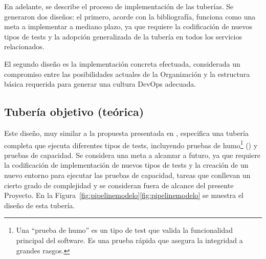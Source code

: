 En adelante, se describe el proceso de implementación de las
tuberías. Se generaron dos diseños: el primero, acorde con la
bibliografía, funciona como una meta a implementar a mediano plazo, ya
que requiere la codificación de nuevos tipos de tests y la adopción
generalizada de la tubería en todos los servicios relacionados.

El segundo diseño es la implementación concreta efectuada, considerada
un compromiso entre las posibilidades actuales de la Organización y la
estructura básica requerida para generar una cultura DevOps adecuada.

\subsection{Tubería objetivo (teórica)}
%
Este diseño, muy similar a la propuesta presentada en
\cite{humblefarley}, especifica una tubería completa que ejecuta
diferentes tipos de tests, incluyendo pruebas de humo\footnote{ Una
  ``prueba de humo'' es un tipo de test que valida la funcionalidad
  principal del software. Es una prueba rápida que asegura la
  integridad a grandes rasgos.} () y pruebas de
capacidad. Se considera una meta a alcanzar a futuro, ya que requiere
la codificación de implementación de nuevos tipos de tests y la
creación de un nuevo entorno para ejecutar las pruebas de capacidad,
tareas que conllevan un cierto grado de complejidad y se consideran
fuera de alcance del presente Proyecto. En la
\iflatexml{}Figura~\ref{fig:pipelinemodelo}\else\autoref{fig:pipelinemodelo}\fi{}
se muestra el diseño de esta tubería.
